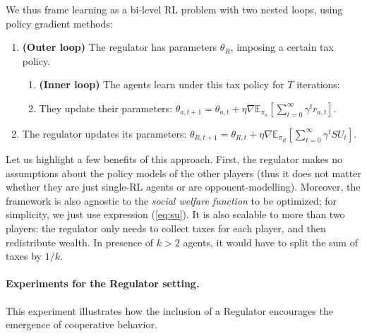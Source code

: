  We thus frame learning as a bi-level RL problem with two nested loops, 
 using policy gradient methods:
\begin{enumerate}
    \item \textbf{(Outer loop)} The regulator 
    has parameters $\theta_R$, imposing a certain tax policy.
    \begin{enumerate}
        \item \textbf{(Inner loop)} The agents learn under this tax policy for $T$ iterations:
        \item They update their parameters: $\theta_{a, t+1} = \theta_{a, t} + \eta \nabla \mathbb{E}_{\pi_a} \left[ \sum_{t=0}^\infty \gamma^t r_{a, t} \right] $.
    \end{enumerate}
    \item The regulator updates its parameters: $\theta_{R, t+1} = \theta_{R, t} + \eta \nabla \mathbb{E}_{\pi_R} \left[ \sum_{t=0}^\infty \gamma^t SU_t \right]  $.
\end{enumerate}




Let us highlight a few benefits of this approach.
First, the regulator makes no assumptions about the policy models of the other players (thus it does not matter whether they are just single-RL agents or are opponent-modelling). Moreover,
the framework is also agnostic to the \emph{social welfare function} to
be optimized; for simplicity, we just use expression (\ref{eq:su}).
     It is also scalable to more than two players: 
     the regulator only needs to collect taxes for each player, and then redistribute wealth.
   In presence of $k > 2$ agents, it would have to split the sum of taxes by $1/k$. 

\paragraph{Experiments for the Regulator setting.}

This experiment 
illustrates %
how the inclusion of a Regulator encourages the emergence of cooperative behavior.

